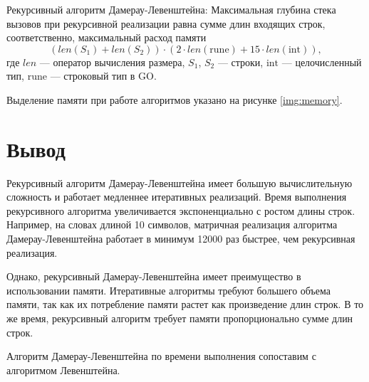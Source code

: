 Рекурсивный алгоритм Дамерау-Левенштейна:
Максимальная глубина стека вызовов при рекурсивной реализации равна сумме длин входящих строк, соответственно, максимальный расход памяти
\begin{equation}
(len(S_1) + len(S_2)) \cdot (2 \cdot len\mathrm{(rune)} + 15 \cdot len\mathrm{(int)}),
\label{for:99}
\end{equation}
где $len$ — оператор вычисления размера, $S_1$, $S_2$ — строки, $\mathrm{int}$ — целочисленный тип, $\mathrm{rune}$ — строковый тип в GO.

Выделение памяти при работе алгоритмов указано на рисунке \ref{img:memory}.


\section*{Вывод}

Рекурсивный алгоритм Дамерау-Левенштейна имеет большую вычислительную сложность и работает медленнее итеративных реализаций. Время выполнения рекурсивного алгоритма увеличивается экспоненциально с ростом длины строк. Например, на словах длиной 10 символов, матричная реализация алгоритма Дамерау-Левенштейна работает в минимум 12000 раз быстрее, чем рекурсивная реализация.

Однако, рекурсивный Дамерау-Левенштейна имеет преимущество в использовании памяти. Итеративные алгоритмы требуют большего объема памяти, так как их потребление памяти растет как произведение длин строк. В то же время, рекурсивный алгоритм требует памяти пропорционально сумме длин строк.

Алгоритм Дамерау-Левенштейна по времени выполнения сопоставим с алгоритмом Левенштейна.

